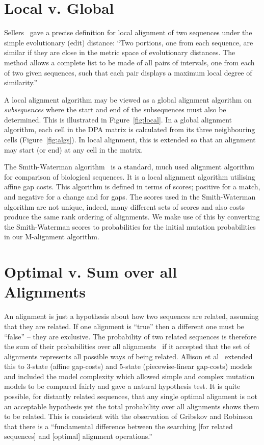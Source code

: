 \documentclass[a4paper,11pt,oneside]{article}
\begin{document}
\section{Local v. Global}

Sellers~\cite{sellers80} gave a precise definition for local alignment
of two sequences under the simple evolutionary (edit) distance:
``Two portions, one from each sequence, are similar if they are close
in the metric space of evolutionary distances. The method allows
a complete list to be made of all pairs of intervals,
one from each of two given sequences, such that each pair
displays a maximum local degree of similarity.''

A local alignment algorithm may be viewed as a global alignment algorithm on
{\em subsequences} where the start and end of the subsequences must also be determined.
This is illustrated in Figure~\ref{fig:local}.  In a global alignment
algorithm, each cell in the DPA matrix is calculated from its three
neighbouring cells (Figure~\ref{fig:algs}). In local alignment, this is
extended so that an alignment may start (or end) at any cell in the matrix.

The Smith-Waterman algorithm~\cite{smith81} is a standard,
much used alignment algorithm for comparison of biological sequences.
It is a local alignment
algorithm utilising affine gap costs.  This algorithm is defined in terms of
scores; positive for a match, and negative for a change and for gaps.  The
scores used in the Smith-Waterman algorithm are not unique, indeed, many
different sets of scores and also costs produce the same rank ordering of
alignments.  We make use of this by converting the Smith-Waterman scores to
probabilities for the initial mutation probabilities in our M-alignment
algorithm.


\section{Optimal v. Sum over all Alignments}

An alignment is just a hypothesis about how two sequences are related,
assuming that they are related.  If one alignment is ``true'' then
a different one must be ``false'' -- they are exclusive.
The probability of two related sequences is therefore the sum of
their probabilities over all alignments~\cite{bishop86}
if it accepted that the set of alignments represents all
possible ways of being related.
Allison et al~\cite{allison92a} extended this to 3-state (affine gap-costs)
and 5-state (piecewise-linear gap-costs) models and included
the model complexity which allowed simple and complex
mutation models to be compared fairly and gave a natural hypothesis test.
It is quite possible, for distantly related sequences, that any single
optimal alignment is not an acceptable hypothesis yet the total probability
over all alignments shows them to be related.
This is consistent with the observation of
Gribskov and Robinson~\cite{gribskov96} that there is
a ``fundamental difference between the searching [for related sequences]
and [optimal] alignment operations.''
\end{document}
